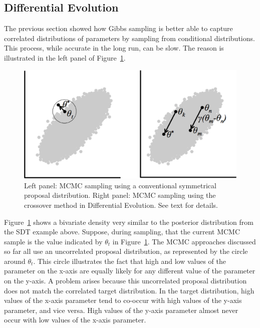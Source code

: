 \subsection{Differential Evolution}

The previous section showed how Gibbs sampling is better able to capture correlated distributions of parameters by sampling from conditional distributions. This process, while accurate in the long run, can be slow. The reason is illustrated in the left panel of Figure~\ref{DE}.

\begin{figure}[!t]
    \begin{center}
        \includegraphics[width=\textwidth]{figs/don_DE4.eps}
        \caption{Left panel: MCMC sampling using a conventional symmetrical proposal distribution. Right panel: MCMC sampling using the crossover method in Differential Evolution. See text for details.}
        \label{DE}
    \end{center}
\end{figure}

Figure~\ref{DE} shows a bivariate density very similar to the posterior distribution from the SDT example above. Suppose, during sampling, that the current MCMC sample is the value indicated by $\theta_t$ in Figure~\ref{DE}. The MCMC approaches discussed so far all use an uncorrelated proposal distribution, as represented by the circle around $\theta_t$. This circle illustrates the fact that high and low values of the parameter on the x-axis are equally likely for any different value of the parameter on the y-axis. A problem arises because this uncorrelated proposal distribution does not match the correlated target distribution. In the target distribution, high values of the x-axis parameter tend to co-occur with high values of the y-axis parameter, and vice versa. High values of the y-axis parameter almost never occur with low values of the x-axis parameter. 

